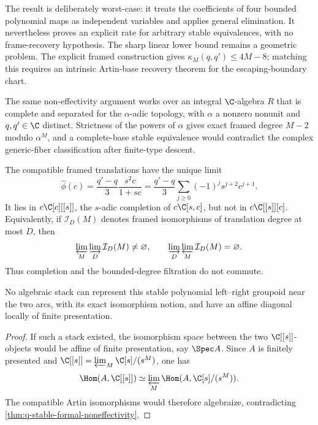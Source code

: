 The result is deliberately worst-case: it treats the coefficients of four
bounded polynomial maps as independent variables and applies general
elimination.  It nevertheless proves an explicit rate for arbitrary stable
equivalences, with no frame-recovery hypothesis.  The sharp linear lower
bound remains a geometric problem.  The explicit framed construction gives
\(\kappa_M(q,q')\le4M-8\); matching this requires an intrinsic Artin-base
recovery theorem for the escaping-boundary chart.

The same non-effectivity argument works over an integral
\(\C\)-algebra \(R\) that is complete and separated for the
\(\alpha\)-adic topology, with \(\alpha\) a nonzero nonunit and
\(q,q'\in\C\) distinct.  Strictness of the powers of \(\alpha\) gives exact
framed degree \(M-2\) modulo \(\alpha^M\), and a complete-base stable
equivalence would contradict the complex generic-fiber classification after
finite-type descent.

The compatible framed translations have the unique limit
\[
 \widehat\phi(c)=\frac{q'-q}{3}\frac{s^2c}{1+sc}
 =\frac{q'-q}{3}\sum_{j\ge0}(-1)^js^{j+2}c^{j+1}.
\]
It lies in \(c\C[c][[s]]\), the \(s\)-adic completion of
\(c\C[s,c]\), but not in \(c\C[[s]][c]\).  Equivalently, if
\(\mathcal I_D(M)\) denotes framed isomorphisms of translation degree at
most \(D\), then
\[
 \varprojlim_M\varinjlim_D\mathcal I_D(M)\ne\varnothing,
 \qquad
 \varinjlim_D\varprojlim_M\mathcal I_D(M)=\varnothing.
\]
Thus completion and the bounded-degree filtration do not commute.

\begin{corollary}
\label{cor:q-no-affine-fp-moduli-diagonal}
No algebraic stack can represent this stable polynomial left--right
groupoid near the two arcs, with its exact isomorphism notion, and have an
affine diagonal locally of finite presentation.
\end{corollary}

\begin{proof}
If such a stack existed, the isomorphism space between the two
\(\C[[s]]\)-objects would be affine of finite presentation, say
\(\Spec A\).  Since \(A\) is finitely presented and
\(\C[[s]]=\varprojlim_M\C[s]/(s^M)\), one has
\[
 \Hom(A,\C[[s]])
 \simeq
 \varprojlim_M\Hom(A,\C[s]/(s^M)).
\]
The compatible Artin isomorphisms would therefore algebraize, contradicting
\cref{thm:q-stable-formal-noneffectivity}.
\end{proof}
